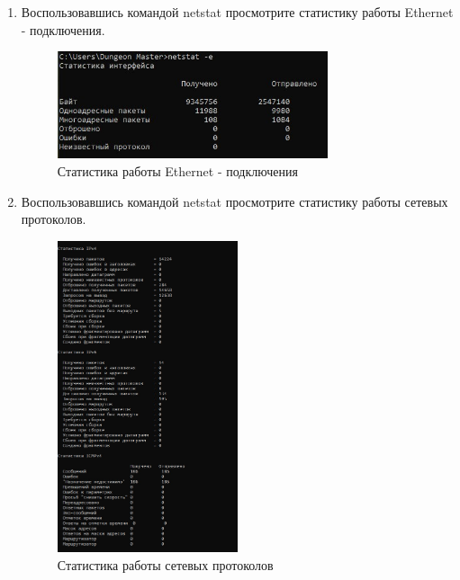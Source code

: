\documentclass[bachelor, och, labwork]{shiza}
\begin{document}


\begin{enumerate}
    
    \item Воспользовавшись командой netstat просмотрите статистику работы Ethernet - подключения.
    
    \begin{figure}[H]
        \centering      %
        \includegraphics[width=0.75\textwidth]{1}
        \caption{Статистика работы Ethernet - подключения}
        \label{fig:image1}
    \end{figure}

    \item Воспользовавшись командой netstat просмотрите статистику работы сетевых протоколов.

    \begin{figure}[H]
        \centering      %
        \includegraphics[width=0.5\textwidth]{2}
        \caption{Статистика работы сетевых протоколов}
        \label{fig:image1}
    \end{figure}


\end{enumerate}
\end{document}

